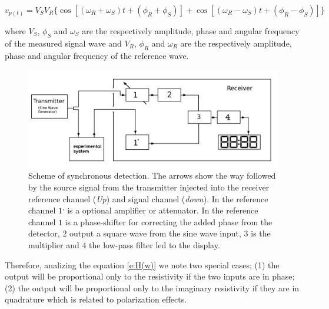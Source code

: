 \documentclass{vie16}
\begin{document}
\begin{equation}
	v_{p(t)} = V_{S}V_{R}\lbrace
								\cos \left[ 
											\left( \omega_{R} + \omega_{S} \right)t + (\phi_{R} + \phi_{S})
									 \right]
									+ 
								\cos \left[ 
											\left( \omega_{R} - \omega_{S} \right)t + (\phi_{R} - \phi_{S})
									 \right]
					     \rbrace
	\label{e:H(w)}
\end{equation}

where $V_{S}$, $\phi_{S}$ and $\omega_{S}$ are the respectively amplitude, phase and angular frequency 
of the measured signal wave and $V_{R}$, $\phi_{R}$ and $\omega_{R}$ are the respectively amplitude, 
phase and angular frequency of the reference wave.


\begin{figure}[H]
	\centering
	\includegraphics[keepaspectratio=true,scale=0.3]{Sistema-Inside_Lock_In}
	\caption{Scheme of synchronous detection. The arrows show the way followed by the source signal from the transmitter injected into the receiver reference channel (\textit{Up}) and signal channel (\textit{down}). In the reference channel $1^{,}$ is a optional amplifier or attenuator. In the reference channel $1$ is a phase-shifter for correcting the added phase from the detector, $2$ output a square wave from the sine wave input, $3$ is the multiplier and  $4$ the low-pass filter led to the display. }
	\label{f:Lock-in}
\end{figure}


Therefore, analizing the equation \ref{e:H(w)} we note two
special cases; (1) the output will be proportional only to the
resistivity if the two inputs are in phase; (2) the output will be
proportional only to the imaginary resistivity if they are in
quadrature which is related to polarization effects.  %
\end{document}
